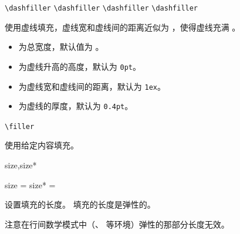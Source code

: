 \documentclass[twoside]{book}
\def\xampletext{\par}
\def\xampleprint{\xamplecode \xampleline \xampletext}
\begin{document}
\begin{function}{\dashfiller}
  \begin{syntax}
    \verb|\dashfiller|
    \verb|\dashfiller| 
    \verb|\dashfiller| 
    \verb|\dashfiller|  
  \end{syntax}
使用虚线填充，虚线宽和虚线间的距离近似为 ，使得虚线充满 。

\begin{itemize}[nosep]
  \item {} 为总宽度，默认值为 。
  \item {} 为虚线升高的高度，默认为 \texttt{0pt}。
  \item {} 为虚线宽和虚线间的距离，默认为 \texttt{1ex}。
  \item {} 为虚线的厚度，默认为 \texttt{0.4pt}。
\end{itemize}
\end{function}

\begin{xample}
\noindent\llap{|}\dashfiller \par %
\noindent\llap{|}\dashfiller [.5ex] \par %
\noindent\llap{|}\dashfiller [.5ex][3pt] \par 
\stopxamplecode
\xampleprint 
\end{xample}

\begin{function}{\filler}
  \begin{syntax}
    \verb|\filler| 
  \end{syntax}
使用给定内容填充。
\end{function}

\begin{keyval}[path=filler]{size,size*}
  \begin{syntax}
    size  = 
    size* = 
  \end{syntax}
设置填充的长度。 填充的长度是弹性的。

注意在行间数学模式中（、 等环境）弹性的那部分长度无效。
\end{keyval}
\end{document}

